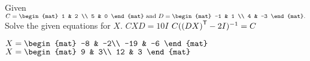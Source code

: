 
\begin{Exercise}[
name={},
title={}, 
difficulty=0,
origin={\cite{YL}}]
Given
$C = \begin{mat}
1 & 2 \\
5 & 0
\end{mat}\text{ and }
D = \begin{mat}
-1 & 1 \\
4 & -3
\end{mat}.
$ Solve the given equations for $X$.
\Question $CXD=10I$
\Question $C({{(DX)}^{\mathsf{T}}}-2I)^{-1}=C$
\end{Exercise}

\begin{Answer}
\Question $
X=
\begin{mat}
-8 & -2\\
-19 & -6
\end{mat}
$
\Question $
X=
\begin{mat}
9 & 3\\
12 & 3
\end{mat}
$
\end{Answer}
